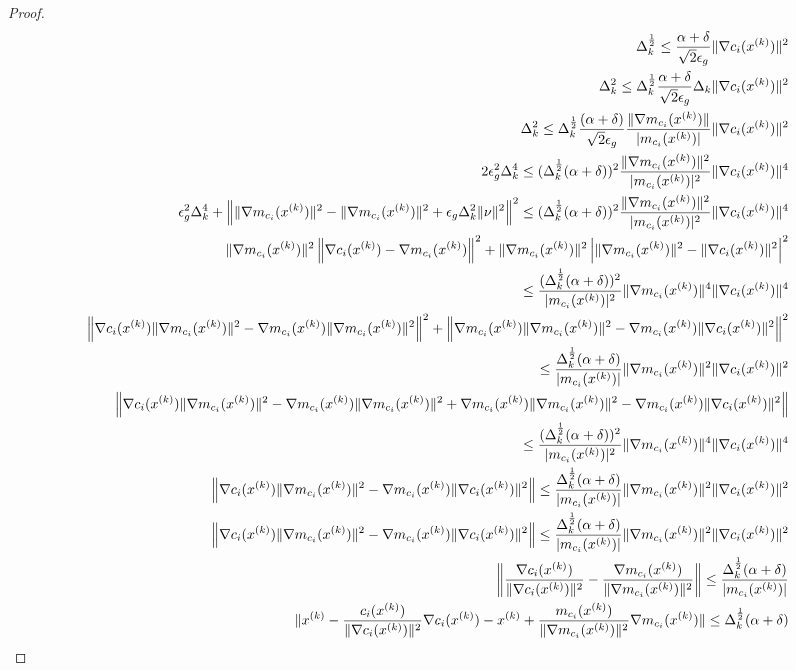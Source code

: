 \begin{proof}
\begin{align*}
\Delta_k^{\frac 1 2} \le \frac{\alpha+\delta}{\sqrt{2}\epsilon_{g}}\|\nabla c_i({x^{(k)}})\|^2\\
\Delta_k^{2} \le \Delta_k^{\frac 1 2}\frac{\alpha+\delta}{\sqrt{2}\epsilon_{g}}\Delta_k\|\nabla c_i({x^{(k)}})\|^2 \\
\Delta_k^{2} \le\Delta_k^{\frac 1 2} \frac{(\alpha + \delta)}{\sqrt{2}\epsilon_{g}}\frac{\|\nabla m_{c_i}({x^{(k)}})\|}{|m_{c_i}({x^{(k)}})|}\|\nabla c_i({x^{(k)}})\|^2\\
2\epsilon_{g}^2\Delta_k^4
\le (\Delta_k^{\frac 1 2}(\alpha + \delta))^2\frac{\|\nabla m_{c_i}({x^{(k)}})\|^2}{|m_{c_i}({x^{(k)}})|^2}\|\nabla c_i({x^{(k)}})\|^4\\
\epsilon_{g}^2\Delta_k^4
+\left\|\|\nabla m_{c_i}({x^{(k)}})\|^2 - \|\nabla m_{c_i}({x^{(k)}})\|^2 + \epsilon_{g}\Delta_k^2\|\nu \|^2 \right\|^2
\le (\Delta_k^{\frac 1 2}(\alpha + \delta))^2\frac{\|\nabla m_{c_i}({x^{(k)}})\|^2}{|m_{c_i}({x^{(k)}})|^2}\|\nabla c_i({x^{(k)}})\|^4\\
\|\nabla m_{c_i}({x^{(k)}})\|^2\left\|\nabla c_i({x^{(k)}}) - \nabla m_{c_i}({x^{(k)}})\right\|^2
+\|\nabla m_{c_i}({x^{(k)}})\|^2\left|\|\nabla m_{c_i}({x^{(k)}})\|^2 - \|\nabla c_i({x^{(k)}})\|^2
\right|^2\\
\le \frac{(\Delta_k^{\frac 1 2}(\alpha + \delta))^2}{|m_{c_i}({x^{(k)}})|^2}\|\nabla m_{c_i}({x^{(k)}})\|^4\|\nabla c_i({x^{(k)}})\|^4\\
\left\|\nabla c_i({x^{(k)}})\|\nabla m_{c_i}({x^{(k)}})\|^2 - \nabla m_{c_i}({x^{(k)}})\|\nabla m_{c_i}({x^{(k)}})\|^2\right\|^2
+\left\|\nabla m_{c_i}({x^{(k)}})\|\nabla m_{c_i}({x^{(k)}})\|^2 - \nabla m_{c_i}({x^{(k)}})\|\nabla c_i({x^{(k)}})\|^2
\right\|^2\\
\le \frac{\Delta_k^{\frac 1 2}(\alpha + \delta)}{|m_{c_i}({x^{(k)}})|}\|\nabla m_{c_i}({x^{(k)}})\|^2\|\nabla c_i({x^{(k)}})\|^2\\
\left\|\nabla c_i({x^{(k)}})\|\nabla m_{c_i}({x^{(k)}})\|^2 - \nabla m_{c_i}({x^{(k)}})\|\nabla m_{c_i}({x^{(k)}})\|^2
+\nabla m_{c_i}({x^{(k)}})\|\nabla m_{c_i}({x^{(k)}})\|^2 - \nabla m_{c_i}({x^{(k)}})\|\nabla c_i({x^{(k)}})\|^2
\right\|\\
\le  \frac{(\Delta_k^{\frac 1 2}(\alpha + \delta))^2}{|m_{c_i}({x^{(k)}})|^2}\|\nabla m_{c_i}({x^{(k)}})\|^4\|\nabla c_i({x^{(k)}})\|^4\\
\left\|\nabla c_i({x^{(k)}})\|\nabla m_{c_i}({x^{(k)}})\|^2 -
\nabla m_{c_i}({x^{(k)}})\|\nabla c_i({x^{(k)}})\|^2
\right\| \le \frac{\Delta_k^{\frac 1 2}(\alpha + \delta)}{|m_{c_i}({x^{(k)}})|}\|\nabla m_{c_i}({x^{(k)}})\|^2\|\nabla c_i({x^{(k)}})\|^2\\
\left\|\nabla c_i({x^{(k)}})\|\nabla m_{c_i}({x^{(k)}})\|^2 -
\nabla m_{c_i}({x^{(k)}})\|\nabla c_i({x^{(k)}})\|^2
\right\| \le \frac{\Delta_k^{\frac 1 2}(\alpha + \delta)}{|m_{c_i}({x^{(k)}})|}\|\nabla m_{c_i}({x^{(k)}})\|^2\|\nabla c_i({x^{(k)}})\|^2\\
\left\|\frac{\nabla c_i({x^{(k)}})}{\|\nabla c_i({x^{(k)}})\|^2} -
\frac{\nabla m_{c_i}({x^{(k)}})}{\|\nabla m_{c_i}({x^{(k)}})\|^2}
\right\| \le \frac{\Delta_k^{\frac 1 2}(\alpha + \delta)}{|m_{c_i}({x^{(k)}})|}\\
\|
{x^{(k)}} - \frac{c_i({x^{(k)}})}{\|\nabla c_i({x^{(k)}})\|^2}\nabla c_i({x^{(k)}}) -
{x^{(k)}} + \frac{m_{c_i}({x^{(k)}})}{\|\nabla m_{c_i}({x^{(k)}})\|^2}\nabla m_{c_i}({x^{(k)}})
\| \le \Delta_k^{\frac 1 2}(\alpha + \delta)\\
\end{align*}



\end{proof}
